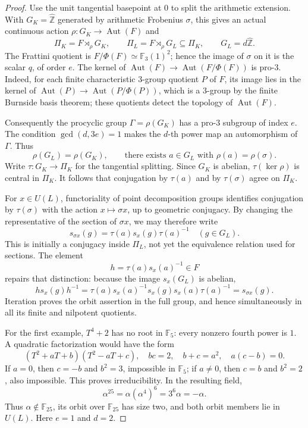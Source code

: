 \begin{proof}
Use the unit tangential basepoint at \(0\) to split the arithmetic
extension.  With \(G_K=\widehat{\mathbb Z}\) generated by arithmetic
Frobenius \(\sigma\), this gives an actual continuous action
\(\rho:G_K\to\operatorname{Aut}(F)\) and
\[
 \Pi_K=F\rtimes_\rho G_K,
 \qquad
 \Pi_L=F\rtimes_\rho G_L\subseteq\Pi_K,
 \qquad G_L=d\widehat{\mathbb Z}.
 \tag{E.150.1}
\]
The Frattini quotient is
\(F/\Phi(F)\simeq\mathbb F_3(1)^2\); hence the image of
\(\sigma\) on it is the scalar \(q\), of order \(e\).
The kernel of
\(\operatorname{Aut}(F)\to\operatorname{Aut}(F/\Phi(F))\)
is pro-\(3\).  Indeed, for each finite characteristic \(3\)-group
quotient \(P\) of \(F\), its image lies in the kernel of
\(\operatorname{Aut}(P)\to\operatorname{Aut}(P/\Phi(P))\),
which is a \(3\)-group by the finite Burnside basis theorem; these
quotients detect the topology of \(\operatorname{Aut}(F)\).

Consequently the procyclic group
\(\Gamma=\rho(G_K)\) has a pro-\(3\) subgroup of index \(e\).
The condition \(\gcd(d,3e)=1\) makes the \(d\)-th power map
an automorphism of \(\Gamma\).  Thus
\[
 \rho(G_L)=\rho(G_K),
 \qquad
 \text{there exists }a\in G_L\text{ with }
 \rho(a)=\rho(\sigma).
 \tag{E.150.2}
\]
Write \(\tau:G_K\to\Pi_K\) for the tangential splitting.
Since \(G_K\) is abelian, \(\tau(\ker\rho)\) is central in
\(\Pi_K\).  It follows that conjugation by \(\tau(a)\) and
by \(\tau(\sigma)\) agree on \(\Pi_K\).

For \(x\in U(L)\), functoriality of point decomposition groups
identifies conjugation by \(\tau(\sigma)\) with the action
\(x\mapsto\sigma x\), up to geometric conjugacy.  By changing the
representative of the section of \(\sigma x\), we may therefore write
\[
 s_{\sigma x}(g)=\tau(a)s_x(g)\tau(a)^{-1}
 \quad(g\in G_L).
\]
This is initially a conjugacy inside \(\Pi_L\), not yet the
equivalence relation used for sections.  The element
\[
 h=\tau(a)s_x(a)^{-1}\in F
\]
repairs that distinction: because the image \(s_x(G_L)\) is abelian,
\[
 h s_x(g) h^{-1}
 =\tau(a)s_x(a)^{-1}s_x(g)s_x(a)\tau(a)^{-1}
 =s_{\sigma x}(g).
 \tag{E.150.3}
\]
Iteration proves the orbit assertion in the full group, and hence
simultaneously in all its finite and nilpotent quotients.

For the first example, \(T^4+2\) has no root in \(\mathbb F_5\):
every nonzero fourth power is \(1\).  A quadratic factorization would
have the form
\[
 (T^2+aT+b)(T^2-aT+c),
 \quad bc=2,\quad b+c=a^2,\quad a(c-b)=0.
\]
If \(a=0\), then \(c=-b\) and \(b^2=3\), impossible in
\(\mathbb F_5\); if \(a\ne0\), then \(c=b\) and \(b^2=2\),
also impossible.  This proves irreducibility.  In the resulting field,
\[
 \alpha^{25}=\alpha(\alpha^4)^6
 =3^6\alpha=-\alpha.
 \tag{E.150.4}
\]
Thus \(\alpha\notin\mathbb F_{25}\), its orbit over
\(\mathbb F_{25}\) has size two, and both orbit members lie in
\(U(L)\).  Here \(e=1\) and \(d=2\).


\end{proof}
